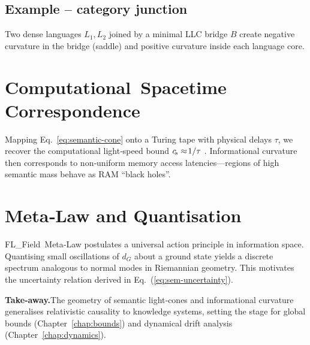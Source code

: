 \subsection*{Example – category junction}
Two dense languages $L_1,L_2$ joined by a minimal LLC bridge $B$ create
negative curvature in the bridge (saddle) and positive curvature inside
each language core.

\section{Computational Spacetime Correspondence}\label{sec:comp-spacetime}

Mapping Eq.~\eqref{eq:semantic-cone} onto a Turing tape with physical
delays $\tau$, we recover the computational light‑speed bound
$c_{\!s}\approx\!1/\tau$ \cite{compSpacetime}.  Informational curvature then
corresponds to non‑uniform memory access latencies—regions of high
semantic mass behave as RAM “black holes”.

\section{Meta‑Law and Quantisation}\label{sec:metalaw}

FL\_Field Meta‑Law postulates a universal action principle in
information space.  Quantising small oscillations of $d_G$ about a
ground state yields a discrete spectrum analogous to normal modes in
Riemannian geometry.  This motivates the uncertainty relation derived in
Eq.~(\ref{eq:sem-uncertainty}).

\bigskip\noindent\textbf{Take‑away.}\;The geometry of semantic light‑cones and
informational curvature generalises relativistic causality to knowledge
systems, setting the stage for global bounds (Chapter~\ref{chap:bounds})
and dynamical drift analysis (Chapter~\ref{chap:dynamics}). 




\clearpage
